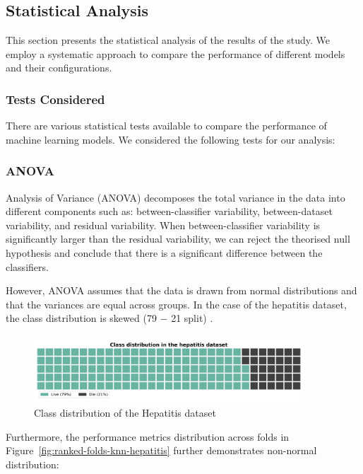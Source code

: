 \subsection{Statistical Analysis}
\label{sec:statistical-analysis}

This section presents the statistical analysis of the results of the study.
We employ a systematic approach to compare the performance of different models and their configurations.

\subsubsection*{Tests Considered}
There are various statistical tests available to compare the performance of machine learning models.
We considered the following tests for our analysis:

\subsubsection{ANOVA}
Analysis of Variance (ANOVA) decomposes the total variance in the data into different components such as:
between-classifier variability, between-dataset variability, and residual variability. When between-classifier
variability is significantly larger than the residual variability, we can reject the theorised null hypothesis and
conclude that there is a significant difference between the classifiers.

However, ANOVA assumes that the data is drawn from normal distributions and that the variances are equal across groups.
In the case of the hepatitis dataset, the class distribution is skewed (79 $-$ 21 split) \cite{StatisticalComparisonsOfClassifiersOverMultipleDataSetsJML,Friedman_anova}.

\begin{figure}[!ht]
    \centering
    \includegraphics[width=0.9\textwidth]{figures/hepatitis-class-distribution.png}
    \caption{Class distribution of the Hepatitis dataset}
\label{fig:class-distribution-hepatitis}
\end{figure}

Furthermore, the performance metrics distribution across folds in Figure~\ref{fig:ranked-folds-knn-hepatitis} further demonstrates non-normal distribution:

